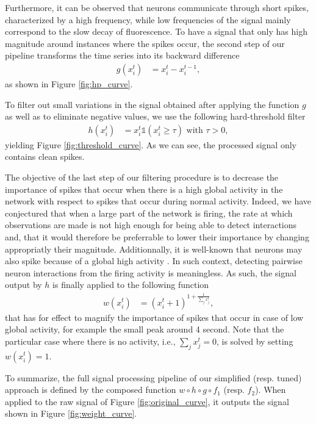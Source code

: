 \documentclass[wcp]{jmlr}
\begin{document}
Furthermore, it can be observed that neurons communicate through short spikes, characterized by a high
frequency, while low frequencies of the signal mainly correspond to the slow
decay of fluorescence. To have a signal that only has high magnitude around instances where the spikes occur, the second step of our pipeline transforms the time series into its backward
difference
\begin{align}
g(x^{t}_{i}) &= x^{t}_i - x^{t-1}_i \label{eq:high-pass-filter},
\end{align}
as shown in Figure \ref{fig:hp_curve}.

To filter out small variations in the signal obtained after applying the
function $g$ as well as to eliminate negative values, we use the following
hard-threshold filter
\begin{align}
h(x^{t}_i) &= x^{t}_i \mathbb{1}(x^{t}_i \geq \tau) \text{ with } \tau > 0,
\end{align}
yielding Figure \ref{fig:threshold_curve}.
As we can see, the processed signal only contains clean spikes.

The objective of the last step of our filtering procedure is to decrease the
importance of spikes that occur when there is a high global activity in the
network with respect to  spikes that occur during normal activity. Indeed, we
have conjectured that when a large part of the network is firing, the rate at
which observations are made is not high enough for being able to detect
interactions and, that it would therefore be preferrable to lower their
importance by changing appropriatly their magnitude. Additionnally, it is
well-known that neurons may also spike because of a global high activity
\citep{stetter2012model}. In such  context, detecting pairwise neuron
interactions from the firing activity is meaningless. As such,
the signal output by $h$ is finally applied to the following function
\begin{align}
 w(x^{t}_i) &= (x^{t}_i + 1 )^{1 + \frac{1}{\sum_{j} x^{t}_j}},
\end{align}
that has for effect to magnify the importance of spikes that occur in case of low global activity, for example the small peak around 4 second. Note that the particular case where there is no activity, i.e., $\sum_{j} x^{t}_j = 0$, is solved by setting $w(x^{t}_i) = 1$. 


To summarize, the full signal processing pipeline of our simplified (resp.
tuned) approach is defined by the composed function $w \circ h \circ g \circ
f_1$ (resp. $f_2$). When applied to the raw signal of Figure
\ref{fig:original_curve}, it outputs the signal shown in Figure
\ref{fig:weight_curve}.
\end{document}
